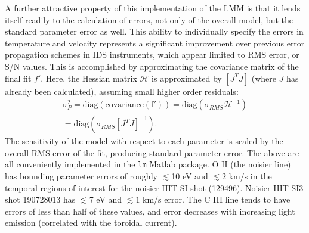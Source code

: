 \hspace*{4ex}A further attractive property of this implementation of the LMM is that it lends itself readily to the calculation of errors, not only of the overall model, but the standard parameter error as well. This ability to individually specify the errors in temperature and velocity represents a significant improvement over previous error propagation schemes in IDS instruments, which appear limited to RMS error, or S/N values. This is accomplished by approximating the covariance matrix of the final fit $f'$. Here, the Hessian matrix $\mathcal{H}$ is approximated by $[J^TJ]$ (where $J$ has already been calculated), assuming small higher order residuals\cite{yuen2010bayesian}:
\begin{eqnarray}
\sigma_P^2 =\mathrm{diag(covariance(f'))}= \mathrm{diag}(\sigma_{RMS}\mathcal{H}^{-1})\nonumber\\ = \mathrm{diag}(\sigma_{RMS}[J^TJ]^{-1}).
\end{eqnarray}
The sensitivity of the model with respect to each parameter is scaled by the overall RMS error of the fit, producing standard parameter error. The above are all conveniently implemented in the \texttt{lm} Matlab package. O II (the noisier line) has bounding parameter errors of roughly $\lesssim$10 eV and $\lesssim2$ km/s in the temporal regions of interest for the noisier HIT-SI shot (129496). Noisier HIT-SI3 shot 190728013 has $\lesssim7$ eV and $\lesssim1$ km/s error. The C III line tends to have errors of less than half of these values, and error decreases with increasing light emission (correlated with the toroidal current).





